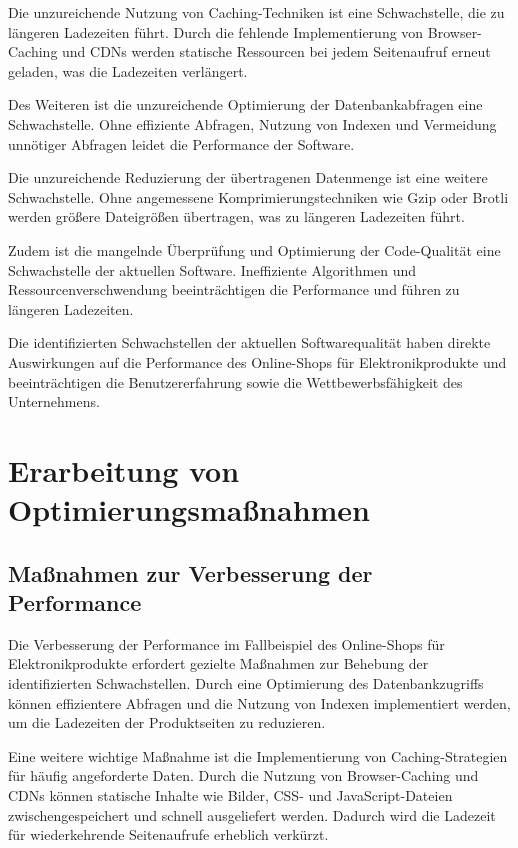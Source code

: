 Die unzureichende Nutzung von Caching-Techniken ist eine Schwachstelle, die zu längeren Ladezeiten führt. Durch die fehlende Implementierung von Browser-Caching und CDNs werden statische Ressourcen bei jedem Seitenaufruf erneut geladen, was die Ladezeiten verlängert.

Des Weiteren ist die unzureichende Optimierung der Datenbankabfragen eine Schwachstelle. Ohne effiziente Abfragen, Nutzung von Indexen und Vermeidung unnötiger Abfragen leidet die Performance der Software.

Die unzureichende Reduzierung der übertragenen Datenmenge ist eine weitere Schwachstelle. Ohne angemessene Komprimierungstechniken wie Gzip oder Brotli werden größere Dateigrößen übertragen, was zu längeren Ladezeiten führt.

Zudem ist die mangelnde Überprüfung und Optimierung der Code-Qualität eine Schwachstelle der aktuellen Software. Ineffiziente Algorithmen und Ressourcenverschwendung beeinträchtigen die Performance und führen zu längeren Ladezeiten.

Die identifizierten Schwachstellen der aktuellen Softwarequalität haben direkte Auswirkungen auf die Performance des Online-Shops für Elektronikprodukte und beeinträchtigen die Benutzererfahrung sowie die Wettbewerbsfähigkeit des Unternehmens.

\section{Erarbeitung von Optimierungsmaßnahmen}
\subsection{Maßnahmen zur Verbesserung der Performance}
Die Verbesserung der Performance im Fallbeispiel des Online-Shops für Elektronikprodukte erfordert gezielte Maßnahmen zur Behebung der identifizierten Schwachstellen. Durch eine Optimierung des Datenbankzugriffs können effizientere Abfragen und die Nutzung von Indexen implementiert werden, um die Ladezeiten der Produktseiten zu reduzieren.

Eine weitere wichtige Maßnahme ist die Implementierung von Caching-Strategien für häufig angeforderte Daten. Durch die Nutzung von Browser-Caching und CDNs können statische Inhalte wie Bilder, CSS- und JavaScript-Dateien zwischengespeichert und schnell ausgeliefert werden. Dadurch wird die Ladezeit für wiederkehrende Seitenaufrufe erheblich verkürzt.

